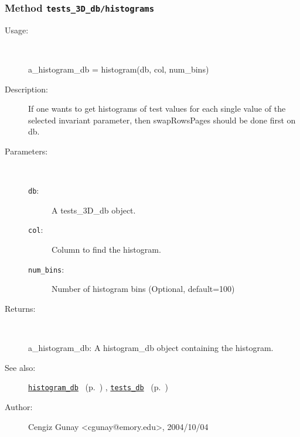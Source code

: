 \subsubsection[Method \texttt{histograms}]{Method \texttt{tests\_3D\_db/histograms}}%
%
\label{ref_tests_3D_db__histograms}%
\hypertarget{ref_tests_3D_db__histograms}{}%
\begin{description}
%
\item[Usage:]~%
\begin{lyxcode}%
a\_histogram\_db = histogram(db, col, num\_bins)
%
\end{lyxcode}%
%
\item[Description:]%
If one wants to get histograms of test values for each single value of
 the selected invariant parameter, then swapRowsPages should be done
 first on db.
\item[Parameters:]~
\begin{description}%
\item[\texttt{db}:]
 A tests\_3D\_db object.
\item[\texttt{col}:]
 Column to find the histogram.
\item[\texttt{num\_bins}:]
 Number of histogram bins (Optional, default=100)
\end{description}%
%
\item[Returns:
]~

	a\_histogram\_db: A histogram\_db object containing the histogram.
%
%
\item[See also:]%
\hyperlink{ref_histogram_db}{\texttt{histogram\_db}}%
\ (p.~\pageref{ref_histogram_db})%
%
, \hyperlink{ref_tests_db}{\texttt{tests\_db}}%
\ (p.~\pageref{ref_tests_db})%
%
%
\item[Author:]%
Cengiz Gunay <cgunay@emory.edu>, 2004/10/04
%
\end{description}
\methodline%
